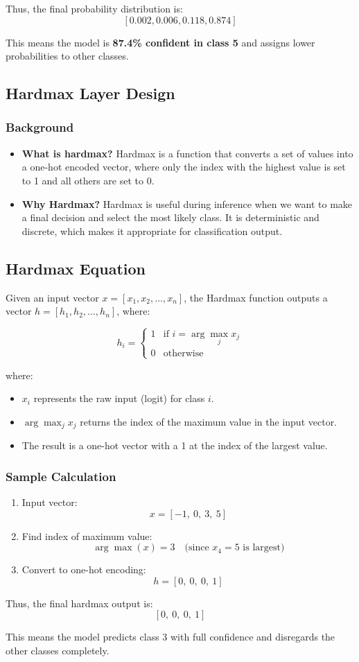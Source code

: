 \documentclass{article}
\begin{document}
Thus, the final probability distribution is:
\[
[0.002, 0.006, 0.118, 0.874]
\]

This means the model is \textbf{87.4\% confident in class 5} and assigns lower probabilities to other classes.

\subsection{Hardmax Layer Design}
\subsubsection{Background} 
\begin{itemize}
  \item \textbf{What is hardmax?}  
    Hardmax is a function that converts a set of values into a one-hot encoded vector, where only the index with the highest value is set to 1 and all others are set to 0.
  \item \textbf{Why Hardmax?}  
    Hardmax is useful during inference when we want to make a final decision and select the most likely class. It is deterministic and discrete, which makes it appropriate for classification output.
\end{itemize}

\subsection{Hardmax Equation}
Given an input vector \( x = [x_1, x_2, ..., x_n] \), the Hardmax function outputs a vector \( h = [h_1, h_2, ..., h_n] \), where:

\[
h_i =
\begin{cases}
1 & \text{if } i = \arg\max_j x_j \\
0 & \text{otherwise}
\end{cases}
\]

\noindent where:
\begin{itemize}
    \item \( x_i \) represents the raw input (logit) for class \( i \).
    \item \( \arg\max_j x_j \) returns the index of the maximum value in the input vector.
    \item The result is a one-hot vector with a 1 at the index of the largest value.
\end{itemize}

\subsubsection{Sample Calculation} 
\begin{enumerate}
    \item Input vector:
    \[
    x = [-1,\ 0,\ 3,\ 5]
    \]

    \item Find index of maximum value:
    \[
    \arg\max(x) = 3 \quad \text{(since } x_4 = 5 \text{ is largest)}
    \]

    \item Convert to one-hot encoding:
    \[
    h = [0,\ 0,\ 0,\ 1]
    \]
\end{enumerate}

\noindent Thus, the final hardmax output is:
\[
[0,\ 0,\ 0,\ 1]
\]

\noindent This means the model predicts class 3 with full confidence and disregards the other classes completely.
\end{document}
